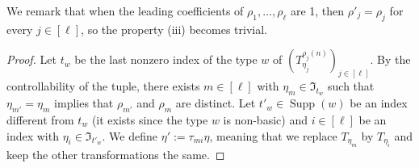 \documentclass[11pt]{amsart}
\theoremstyle{definition}
\newcommand{\N}{{\mathbb N}}
\newcommand{\FI}{{\mathfrak I}}
\DeclareMathOperator{\supp}{Supp}
\newcommand{\brac}[1]{\mathopen{}\left( #1 \mathclose{}\right)}
\begin{document}
We remark that when the leading coefficients of $\rho_1, \ldots, \rho_\ell$ are 1, then $\rho'_j  = \rho_j$ for every $j\in[\ell]$, so the property (iii) becomes trivial.


\begin{proof}%
Let $t_w$ be the last nonzero index of the type $w$ of $\brac{T_{\eta_j}^{\rho_j(n)}}_{j\in[\ell]}$. By the controllability of the tuple, there exists $m\in[\ell]$ with $\eta_m\in\FI_{t_w}$ such that $\eta_{m'}=\eta_m$ implies that $\rho_{m'}$ and $\rho_m$ are distinct. Let $t'_w\in\supp(w)$ be an index different from $t_w$ (it exists since the type $w$ is non-basic) and $i\in[\ell]$ be an index with $\eta_i\in \FI_{t'_w}$. We define $\eta':=\tau_{mi}\eta$, meaning that we replace $T_{\eta_m}$ by $T_{\eta_i}$ and keep the other transformations the same.






\end{proof}
\end{document}
